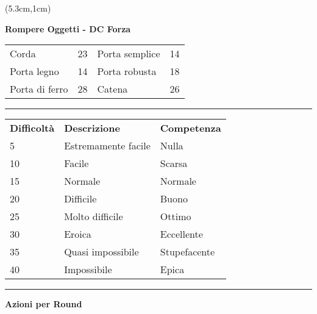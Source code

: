 \documentclass[a4paper,12 pt,openany]{book}
\newcommand{\riga}{\rule{\textwidth}{0.4pt}}
\begin{document}
\begin{textblock*}{8.3cm}(5.3cm,1cm)

\textbf{Rompere Oggetti - DC Forza}\\
\begin{tabular}{ll|ll}
Corda   		   & 23&	Porta semplice         & 14\\
Porta legno        & 14&	Porta robusta          & 18\\
Porta di ferro     & 28&	Catena                 & 26 \\
\end{tabular}

\riga

\begin{tabular}{lll}
\textbf{Difficoltà} & \textbf{Descrizione} & \textbf{Competenza} \\
5 & Estremamente facile  & Nulla\\
10  & Facile & Scarsa\\
15  & Normale  & Normale\\
20  & Difficile  & Buono\\
25  & Molto difficile  & Ottimo\\
30  & Eroica  	 & Eccellente\\
35  & Quasi impossibile & Stupefacente\\
40  & Impossibile  & Epica\\
\end{tabular}


\riga

\textbf{Azioni per Round} 


\end{textblock*}
\end{document}
